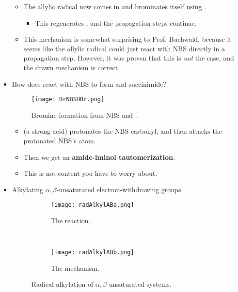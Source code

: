 \documentclass[../notes.tex]{subfiles}
\begin{document}
\begin{itemize}
\begin{itemize}
\begin{itemize}
        \end{itemize}
        \item The allylic radical now comes in and brominates itself using .
        \begin{itemize}
            \item This regenerates , and the propagation steps continue.
        \end{itemize}
        \item This mechanism is somewhat surprising to Prof. Buchwald, because it seems like the allylic radical could just react with NBS directly in a propagation step. However, it was proven that this is \emph{not} the case, and the drawn mechanism is correct.
    \end{itemize}
    \pagebreak
    \item How does  react with NBS to form  and succinimide?
    \begin{figure}[h!]
        \centering
        \texttt{[image: BrNBSHBr.png]}
        \caption{Bromine formation from NBS and .}
        \label{fig:BrNBSHBr}
    \end{figure}
    \begin{itemize}
        \item {} (a strong acid) protonates the NBS carbonyl, and then  attacks the protonated NBS's  atom.
        \item Then we get an \textbf{amide-iminol tautomerization}.
        \item This is not content you have to worry about.
    \end{itemize}
    \item Alkylating $\alpha,\beta$-unsaturated electron-withdrawing groups.
    \begin{figure}[h!]
        \centering
        \begin{subfigure}[b]{\linewidth}
            \centering
            \texttt{[image: radAlkylABa.png]}
            \caption{The reaction.}
            \label{fig:radAlkylABa}
        \end{subfigure}\\[2em]
        \begin{subfigure}[b]{\linewidth}
            \centering
            \texttt{[image: radAlkylABb.png]}
            \caption{The mechanism.}
            \label{fig:radAlkylABb}
        \end{subfigure}
        \caption{Radical alkylation of $\alpha,\beta$-unsaturated systems.}

\end{figure}
\end{itemize}
\end{document}
